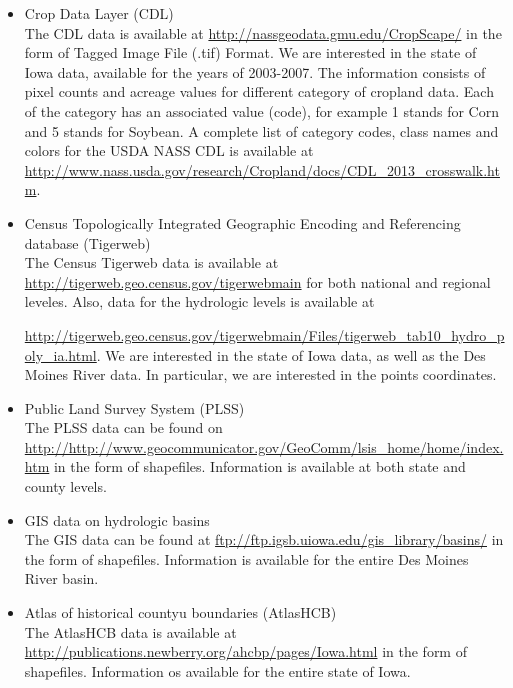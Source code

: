 \documentclass{article}\usepackage[]{graphicx}\usepackage[]{color}
\begin{document}
\begin{itemize}

\item Crop Data Layer (CDL)\\


The CDL data is available at \href {CDL} {http://nassgeodata.gmu.edu/CropScape/} in the form of Tagged Image File (.tif) Format. We are interested in the state of Iowa data, available for the years of 2003-2007. The information consists of pixel counts and acreage values for different category of cropland data. Each of the category has an associated value (code), for example 1 stands for Corn and 5 stands for Soybean. A complete list of category codes, class names and colors for the USDA NASS CDL is available at \href{Codes}{http://www.nass.usda.gov/research/Cropland/docs/CDL_2013_crosswalk.htm}.


\item Census Topologically Integrated Geographic Encoding and Referencing database (Tigerweb) \\


The Census Tigerweb data is available at \href{Census}{http://tigerweb.geo.census.gov/tigerwebmain} for both national and regional leveles. Also, data for the hydrologic levels is available at 

\href{HydroCensus}{http://tigerweb.geo.census.gov/tigerwebmain/Files/tigerweb_tab10_hydro_poly_ia.html}. We are interested in the state of Iowa data, as well as the Des Moines River data. In particular, we are interested in the points coordinates. 


\item Public Land Survey System (PLSS)\\

The PLSS data can be found on \href{PLSS}{http://http://www.geocommunicator.gov/GeoComm/lsis_home/home/index.htm} in the form of shapefiles. Information is available at both state and county levels.  
\item   GIS data on hydrologic basins\\

The GIS data can be found at \href{GIS}{ftp://ftp.igsb.uiowa.edu/gis_library/basins/} in the form of shapefiles. Information is available for the entire Des Moines River basin.

\item   Atlas of historical countyu boundaries (AtlasHCB)\\

The AtlasHCB data is available at \href{AtlasHCB}{http://publications.newberry.org/ahcbp/pages/Iowa.html} in the form of shapefiles. Information os available for the entire state of Iowa.


\end{itemize}
\end{document}
